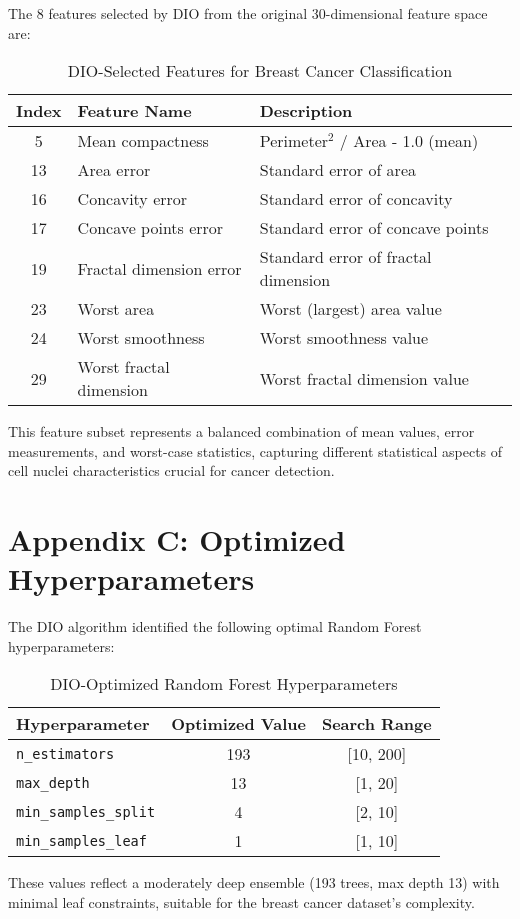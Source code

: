 \documentclass[12pt, a4paper]{article}
\begin{document}
The 8 features selected by DIO from the original 30-dimensional feature space are:

\begin{table}[H]
    \centering
    \caption{DIO-Selected Features for Breast Cancer Classification}
    \begin{tabular}{clp{7cm}}
        \toprule
        \textbf{Index} & \textbf{Feature Name} & \textbf{Description} \\
        \midrule
        5 & Mean compactness & Perimeter$^2$ / Area - 1.0 (mean) \\
        13 & Area error & Standard error of area \\
        16 & Concavity error & Standard error of concavity \\
        17 & Concave points error & Standard error of concave points \\
        19 & Fractal dimension error & Standard error of fractal dimension \\
        23 & Worst area & Worst (largest) area value \\
        24 & Worst smoothness & Worst smoothness value \\
        29 & Worst fractal dimension & Worst fractal dimension value \\
        \bottomrule
    \end{tabular}
\end{table}

This feature subset represents a balanced combination of mean values, error measurements, and worst-case statistics, capturing different statistical aspects of cell nuclei characteristics crucial for cancer detection.

\section{Appendix C: Optimized Hyperparameters}

The DIO algorithm identified the following optimal Random Forest hyperparameters:

\begin{table}[H]
    \centering
    \caption{DIO-Optimized Random Forest Hyperparameters}
    \begin{tabular}{lcc}
        \toprule
        \textbf{Hyperparameter} & \textbf{Optimized Value} & \textbf{Search Range} \\
        \midrule
        \texttt{n\_estimators} & 193 & [10, 200] \\
        \texttt{max\_depth} & 13 & [1, 20] \\
        \texttt{min\_samples\_split} & 4 & [2, 10] \\
        \texttt{min\_samples\_leaf} & 1 & [1, 10] \\
        \bottomrule
    \end{tabular}
\end{table}

These values reflect a moderately deep ensemble (193 trees, max depth 13) with minimal leaf constraints, suitable for the breast cancer dataset's complexity.
\end{document}
